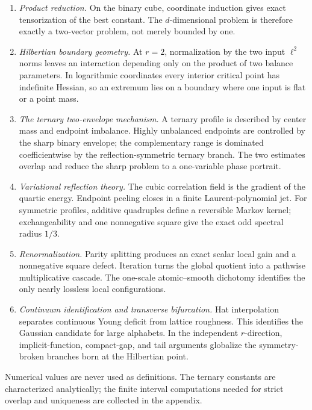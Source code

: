 \documentclass[11pt,reqno]{amsart}
\numberwithin{equation}{section}
\theoremstyle{definition}
\theoremstyle{remark}
\begin{document}
\begin{enumerate}[label=\textup{(\arabic*)},leftmargin=2.2em]
\item \emph{Product reduction.}  On the binary cube, coordinate induction gives exact tensorization of the best constant.  The $d$-dimensional problem is therefore exactly a two-vector problem, not merely bounded by one.
\item \emph{Hilbertian boundary geometry.}  At $r=2$, normalization by the two input $\ell^2$ norms leaves an interaction depending only on the product of two balance parameters.  In logarithmic coordinates every interior critical point has indefinite Hessian, so an extremum lies on a boundary where one input is flat or a point mass.
\item \emph{The ternary two-envelope mechanism.}  A ternary profile is described by center mass and endpoint imbalance.  Highly unbalanced endpoints are controlled by the sharp binary envelope; the complementary range is dominated coefficientwise by the reflection-symmetric ternary branch.  The two estimates overlap and reduce the sharp problem to a one-variable phase portrait.
\item \emph{Variational reflection theory.}  The cubic correlation field is the gradient of the quartic energy.  Endpoint peeling closes in a finite Laurent-polynomial jet.  For symmetric profiles, additive quadruples define a reversible Markov kernel; exchangeability and one nonnegative square give the exact odd spectral radius $1/3$.
\item \emph{Renormalization.}  Parity splitting produces an exact scalar local gain and a nonnegative square defect.  Iteration turns the global quotient into a pathwise multiplicative cascade.  The one-scale atomic--smooth dichotomy identifies the only nearly lossless local configurations.
\item \emph{Continuum identification and transverse bifurcation.}  Hat interpolation separates continuous Young deficit from lattice roughness.  This identifies the Gaussian candidate for large alphabets.  In the independent $r$-direction, implicit-function, compact-gap, and tail arguments globalize the symmetry-broken branches born at the Hilbertian point.
\end{enumerate}

Numerical values are never used as definitions.  The ternary constants are characterized analytically; the finite interval computations needed for strict overlap and uniqueness are collected in the appendix.
\end{document}
